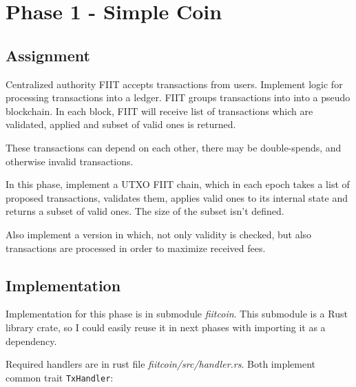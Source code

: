 \section{Phase 1 - Simple Coin}\label{phase1}

\subsection{Assignment}

Centralized authority FIIT accepts transactions from users. Implement logic
for processing transactions into a ledger. FIIT groups transactions into 
into a pseudo blockchain. In each block, FIIT will receive list of transactions
which are validated, applied and subset of valid ones is returned.

These transactions can depend on each other, there may be double-spends, and
otherwise invalid transactions.

In this phase, implement a UTXO FIIT chain, which in each epoch takes a list
of proposed transactions, validates them, applies valid ones to its internal
state and returns a subset of valid ones. The size of the subset isn't defined.

Also implement a version in which, not only validity is checked, but also transactions
are processed in order to maximize received fees.

\subsection{Implementation}

Implementation for this phase is in submodule \emph{fiitcoin}. This submodule
is a Rust library crate, so I could easily reuse it in next phases with importing
it as a dependency.

Required handlers are in rust file \emph{fiitcoin/src/handler.rs}. Both implement
common trait \texttt{TxHandler}:

